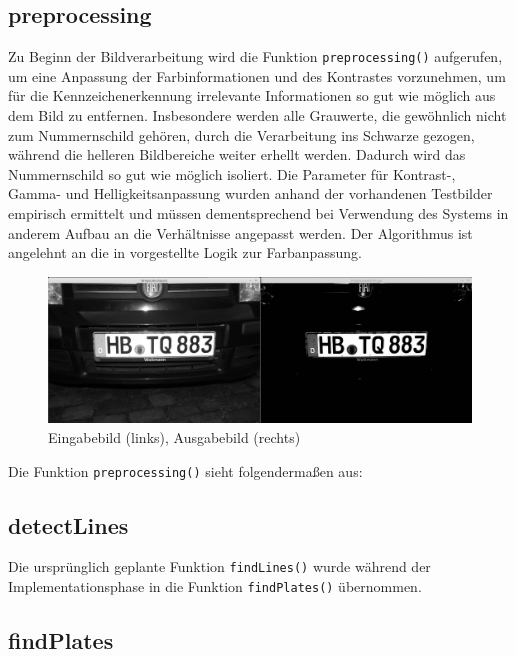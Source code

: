\documentclass{../Vorlage/sebDenCls}
\begin{document}
\subsection{preprocessing}
\label{prepro}
Zu Beginn der Bildverarbeitung wird die Funktion \texttt{preprocessing()} aufgerufen, um eine Anpassung der Farbinformationen und des Kontrastes vorzunehmen, um für die Kennzeichenerkennung irrelevante Informationen so gut wie möglich aus dem Bild zu entfernen.
Insbesondere werden alle Grauwerte, die gewöhnlich nicht zum Nummernschild gehören, durch die Verarbeitung ins Schwarze gezogen, während die helleren Bildbereiche weiter erhellt werden. Dadurch wird das Nummernschild so gut wie möglich isoliert. Die Parameter für Kontrast-, Gamma-  und Helligkeitsanpassung wurden anhand der vorhandenen Testbilder empirisch ermittelt und müssen dementsprechend bei Verwendung des Systems in anderem Aufbau an die Verhältnisse angepasst werden. Der Algorithmus ist angelehnt an die in \cite{gimp17} vorgestellte Logik zur Farbanpassung.\\

\begin{figure}[htp]
	\centering 	
	\includegraphics[width=.9\textwidth]{beispiel_preprocessing} 
	\caption{Eingabebild (links), Ausgabebild (rechts) \label{beispiel_preprocessing}}
\end{figure}

Die Funktion \texttt{preprocessing()} sieht folgendermaßen aus:\\



\subsection{detectLines}
Die ursprünglich geplante Funktion \texttt{findLines()} wurde während der Implementationsphase in die Funktion \texttt{findPlates()} übernommen. 

\subsection{findPlates}
\label{findpl}
\end{document}
